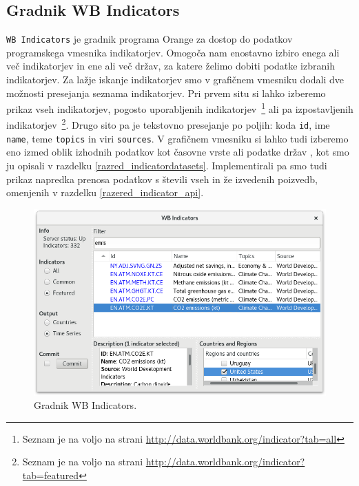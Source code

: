 \subsection{Gradnik WB Indicators}

\verb|WB Indicators| je gradnik programa Orange za dostop do podatkov
programskega vmesnika indikatorjev. Omogoča nam enostavno izbiro
enega ali več indikatorjev in ene ali več držav, za katere želimo dobiti
podatke izbranih indikatorjev. Za lažje iskanje indikatorjev smo v grafičnem
vmesniku dodali dve možnosti presejanja seznama indikatorjev. Pri prvem situ
si lahko izberemo prikaz vseh indikatorjev, pogosto uporabljenih 
indikatorjev~\footnote{Seznam je na voljo na strani 
\url{http://data.worldbank.org/indicator?tab=all}}
ali pa izpostavljenih indikatorjev~\footnote{Seznam je na voljo na strani 
\url{http://data.worldbank.org/indicator?tab=featured}}. Drugo sito pa je
tekstovno presejanje po poljih: koda {\tt id}, ime {\tt name}, teme {\tt topics} in
viri {\tt sources}. 
V grafičnem vmesniku si lahko tudi izberemo eno izmed oblik izhodnih podatkov
kot časovne vrste  ali podatke držav , 
kot smo ju opisali v razdelku \ref{razred_indicatordatasets}. 
Implementirali pa smo tudi prikaz napredka prenosa podatkov s števili vseh in
že izvedenih poizvedb, omenjenih v razdelku \ref{razered_indicator_api}.


\begin{figure}
\begin{center}
\includegraphics[width=12cm]{pic/co2_temp_indicator_selection.png}
\end{center}
\caption{Gradnik WB Indicators.}
\label{co2_temp_indicator}
\end{figure} 




